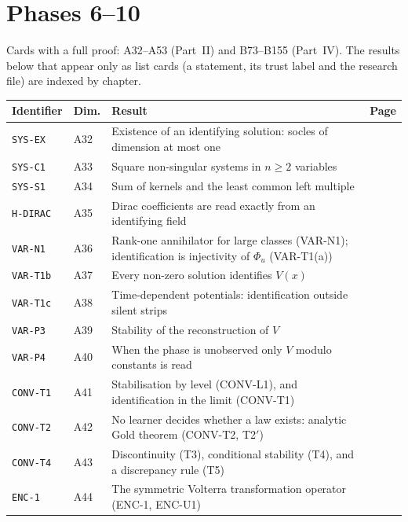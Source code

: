\section*{Phases 6--10}
Cards with a full proof: A32--A53 (Part~II) and B73--B155 (Part~IV). The results below that appear only as list cards (a statement, its trust label and the research file) are indexed by chapter.

\begin{center}\small
\begin{longtable}{@{}L{3.6cm}L{1.2cm}L{8.0cm}L{1.2cm}@{}}
\toprule
Identifier & Dim. & Result & Page\\ \midrule\endhead
\texttt{SYS-EX} & A32 & Existence of an identifying solution: socles of dimension at most one & \pageref{dim:SYS-EX}\\
\texttt{SYS-C1} & A33 & Square non-singular systems in $n\ge2$ variables & \pageref{dim:SYS-C1}\\
\texttt{SYS-S1} & A34 & Sum of kernels and the least common left multiple & \pageref{dim:SYS-S1}\\
\texttt{H-DIRAC} & A35 & Dirac coefficients are read exactly from an identifying field & \pageref{dim:H-DIRAC}\\
\texttt{VAR-N1} & A36 & Rank-one annihilator for large classes (VAR-N1); identification is injectivity of $\Phi_u$ (VAR-T1(a)) & \pageref{dim:VAR-N1}\\
\texttt{VAR-T1b} & A37 & Every non-zero solution identifies $V(x)$ & \pageref{dim:VAR-T1b}\\
\texttt{VAR-T1c} & A38 & Time-dependent potentials: identification outside silent strips & \pageref{dim:VAR-T1c}\\
\texttt{VAR-P3} & A39 & Stability of the reconstruction of $V$ & \pageref{dim:VAR-P3}\\
\texttt{VAR-P4} & A40 & When the phase is unobserved only $V$ modulo constants is read & \pageref{dim:VAR-P4}\\
\texttt{CONV-T1} & A41 & Stabilisation by level (CONV-L1), and identification in the limit (CONV-T1) & \pageref{dim:CONV-T1}\\
\texttt{CONV-T2} & A42 & No learner decides whether a law exists: analytic Gold theorem (CONV-T2, T2$'$) & \pageref{dim:CONV-T2}\\
\texttt{CONV-T4} & A43 & Discontinuity (T3), conditional stability (T4), and a discrepancy rule (T5) & \pageref{dim:CONV-T4}\\
\texttt{ENC-1} & A44 & The symmetric Volterra transformation operator (ENC-1, ENC-U1) & \pageref{dim:ENC-1}\\

\end{longtable}
\end{center}
